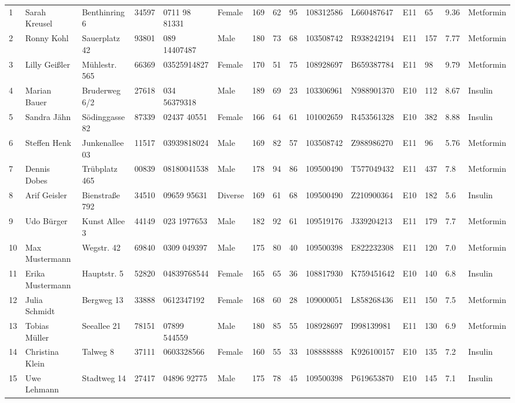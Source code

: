 \begin{table}
\begin{longtable}{lllllllllllllll}
    
    1 & Sarah Kreusel & Benthinring 6 & 34597 & 0711 98 81331 & Female & 169 & 62 & 95 & 108312586 & L660487647 & E11 & 65 & 9.36 & Metformin \\
    2 & Ronny Kohl & Sauerplatz 42 & 93801 & 089 14407487 & Male & 180 & 73 & 68 & 103508742 & R938242194 & E11 & 157 & 7.77 & Metformin \\
    3 & Lilly Geißler & Mühlestr. 565 & 66369 & 03525914827 & Female & 170 & 51 & 75 & 108928697 & B659387784 & E11 & 98 & 9.79 & Metformin \\
    4 & Marian Bauer & Bruderweg 6/2 & 27618 & 034 56379318 & Male & 189 & 69 & 23 & 103306961 & N988901370 & E10 & 112 & 8.67 & Insulin \\
    5 & Sandra Jähn & Södinggasse 82 & 87339 & 02437 40551 & Female & 166 & 64 & 61 & 101002659 & R453561328 & E10 & 382 & 8.88 & Insulin \\
    6 & Steffen Henk & Junkenallee 03 & 11517 & 03939818024 & Male & 169 & 82 & 57 & 103508742 & Z988986270 & E11 & 96 & 5.76 & Metformin \\
    7 & Dennis Dobes & Trübplatz 465 & 00839 & 08180041538 & Male & 178 & 94 & 86 & 109500490 & T577049432 & E11 & 437 & 7.8 & Metformin \\
    8 & Arif Geisler & Bienstraße 792 & 34510 & 09659 95631 & Diverse & 169 & 61 & 68 & 109500490 & Z210900364 & E10 & 182 & 5.6 & Insulin \\
    9 & Udo Bürger & Kunst Allee 3 & 44149 & 023 1977653 & Male & 182 & 92 & 61 & 109519176 & J339204213 & E11 & 179 & 7.7 & Metformin \\
    10 & Max Mustermann & Wegstr. 42 & 69840 & 0309 049397 & Male & 175 & 80 & 40 & 109500398 & E822232308 & E11 & 120 & 7.0 & Metformin \\
    11 & Erika Mustermann & Hauptstr. 5 & 52820 & 04839768544 & Female & 165 & 65 & 36 & 108817930 & K759451642 & E10 & 140 & 6.8 & Insulin \\
    12 & Julia Schmidt & Bergweg 13 & 33888 & 0612347192 & Female & 168 & 60 & 28 & 109000051 & L858268436 & E11 & 150 & 7.5 & Metformin \\
    13 & Tobias Müller & Seeallee 21 & 78151 & 07899 544559 & Male & 180 & 85 & 55 & 108928697 & I998139981 & E11 & 130 & 6.9 & Metformin \\
    14 & Christina Klein & Talweg 8 & 37111 & 0603328566 & Female & 160 & 55 & 33 & 108888888 & K926100157 & E10 & 135 & 7.2 & Insulin \\
    15 & Uwe Lehmann & Stadtweg 14 & 27417 & 04896 92775 & Male & 175 & 78 & 45 & 109500398 & P619653870 & E10 & 145 & 7.1 & Insulin \\

\end{longtable}
\end{table}
